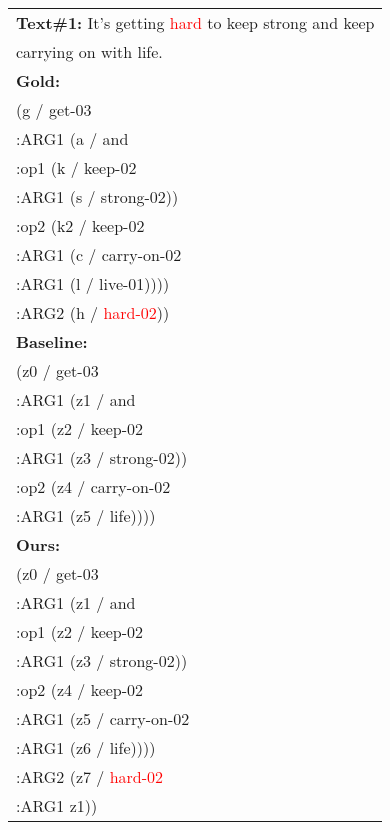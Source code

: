 \documentclass[11pt]{article}
\begin{document}
\begin{table}[!t]
    \centering
    \small
    \begin{tabular}{l}
        \toprule
        \textbf{Text\#1:} It's getting \textcolor{red}{hard} to keep strong and keep \\ \quad\quad carrying on with life. \\
        \midrule
        \textbf{Gold:}  \\
        \quad (g / get-03      \\
        \quad\quad:ARG1 (a / and \\
            \quad\quad\quad :op1 (k / keep-02 \\
            \quad\quad\quad\quad      :ARG1 (s / strong-02)) \\
            \quad\quad\quad:op2 (k2 / keep-02 \\
            \quad\quad\quad\quad :ARG1 (c /  carry-on-02 \\
            \quad\quad\quad\quad\quad:ARG1 (l / live-01)))) \\
      \quad\quad:ARG2 (h / \textcolor{red}{hard-02}))\\
        \midrule
        \textbf{Baseline:} \\
    \quad (z0 / get-03 \\
    \quad\quad:ARG1 (z1 / and \\
    \quad\quad\quad :op1 (z2 / keep-02 \\
    \quad\quad\quad\quad:ARG1 (z3 / strong-02)) \\
    \quad\quad\quad :op2 (z4 / carry-on-02 \\
    \quad\quad\quad\quad:ARG1 (z5 / life)))) \\
    \midrule
    \textbf{Ours:} \\
    \quad (z0 / get-03  \\
    \quad\quad :ARG1 (z1 / and \\
    \quad\quad\quad:op1 (z2 / keep-02 \\
    \quad\quad\quad\quad:ARG1 (z3 / strong-02)) \\
    \quad\quad\quad:op2 (z4 / keep-02 \\
    \quad\quad\quad\quad:ARG1 (z5 / carry-on-02 \\
    \quad\quad\quad\quad\quad:ARG1 (z6 / life)))) \\
    \quad\quad :ARG2 (z7 / \textcolor{red}{hard-02} \\
    \quad\quad\quad :ARG1 z1)) \\
    \midrule
    \midrule

\end{tabular}
\end{table}
\end{document}
